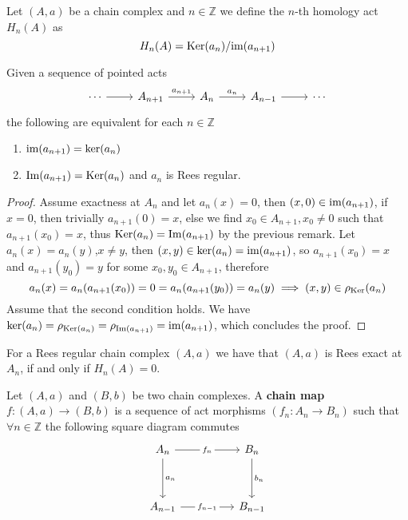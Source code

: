 \begin{definition}
    Let $(A,a)$ be a chain complex and $n\in\mathbb{Z}$ we define the $n$-th homology act $H_n(A)$ as 
    \[
        H_n(A) = \mathrm{Ker}(a_n)/\text{im}(a_{n+1})
    \]
\end{definition}
\begin{proposition}\label{regularityProp}
    Given a sequence of pointed acts 
    \[\begin{tikzcd}
        \cdots & {A_{n+1}} & {A_n} & {A_{n-1}} & \cdots
        \arrow[from=1-1, to=1-2]
        \arrow["{a_{n+1}}", from=1-2, to=1-3]
        \arrow["{a_n}", from=1-3, to=1-4]
        \arrow[from=1-4, to=1-5]
    \end{tikzcd}\]
    the following are equivalent for each $n\in\mathbb{Z}$
    \begin{enumerate}
        \item $\text{im}(a_{n+1})=\mathrm{ker}(a_n)$
        \item $\mathrm{Im}(a_{n+1})=\mathrm{Ker}(a_n)$ and $a_n$ is Rees regular.
    \end{enumerate}
\end{proposition}
\begin{proof}[Proof]
    Assume exactness at $A_n$ and let $a_n(x)=0$, then $(x,0)\in\text{im}(a_{n+1})$, if 
    $x=0$, then trivially $a_{n+1}(0)=x$, else we find $x_0\in A_{n+1},x_0\neq 0$ such that $a_{n+1}(x_0)=x$, thus
    $\mathrm{Ker}(a_n)=\mathrm{Im}(a_{n+1})$ by the previous remark. Let $a_n(x)=a_n(y)$,$x\neq y$, then $(x,y)\in\mathrm{ker}(a_n)=\text{im}(a_{n+1})$, 
    so $a_{n+1}(x_0)=x$ and $a_{n+1}(y_0)=y$ for some $x_0,y_0\in A_{n+1}$, therefore 
    \[
        a_n(x)= a_n(a_{n+1}(x_0)) = 0 = a_n(a_{n+1}(y_0)) = a_n(y) \implies (x,y)\in\rho_\mathrm{Ker}(a_n)
    \]
    Assume that the second condition holds. We have $\mathrm{ker}(a_n) = \rho_{\mathrm{Ker}(a_n)} = \rho_{\mathrm{Im}(a_{n+1})} = \text{im}(a_{n+1})$, 
    which concludes the proof.
\end{proof}
\begin{remark}
    For a Rees regular chain complex $(A,a)$ we have that $(A,a)$ is Rees exact at $A_n$, if and only if $H_n(A)=0$.
\end{remark}
\begin{definition}
    Let $(A,a)$ and $(B,b)$ be two chain complexes. A \textbf{chain map} $f:(A,a)\to(B,b)$ is a sequence of act morphisms $(f_n: A_n\to B_n)$ 
    such that $\forall n\in\mathbb{Z}$ the following square diagram commutes
    \[\begin{tikzcd}
        {A_n} && {B_n} \\
        \\
        {A_{n-1}} && {B_{n-1}}
        \arrow["{f_n}"{description}, from=1-1, to=1-3]
        \arrow["{a_n}", from=1-1, to=3-1]
        \arrow["{b_n}", from=1-3, to=3-3]
        \arrow["{f_{n-1}}"{description}, from=3-1, to=3-3]
    \end{tikzcd}\]
\end{definition}

